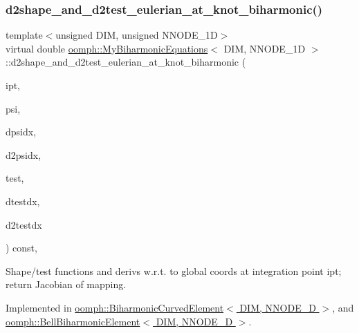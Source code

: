 \subsubsection{\texorpdfstring{d2shape\+\_\+and\+\_\+d2test\+\_\+eulerian\+\_\+at\+\_\+knot\+\_\+biharmonic()}{d2shape\_and\_d2test\_eulerian\_at\_knot\_biharmonic()}\hspace{0.1cm}{\footnotesize\ttfamily [2/2]}}
{\footnotesize\ttfamily template$<$unsigned D\+IM, unsigned N\+N\+O\+D\+E\+\_\+1D$>$ \\
virtual double \hyperlink{classoomph_1_1MyBiharmonicEquations}{oomph\+::\+My\+Biharmonic\+Equations}$<$ D\+IM, N\+N\+O\+D\+E\+\_\+1D $>$\+::d2shape\+\_\+and\+\_\+d2test\+\_\+eulerian\+\_\+at\+\_\+knot\+\_\+biharmonic (\begin{DoxyParamCaption}\item[{const unsigned \&}]{ipt,  }\item[{Shape \&}]{psi,  }\item[{D\+Shape \&}]{dpsidx,  }\item[{D\+Shape \&}]{d2psidx,  }\item[{Shape \&}]{test,  }\item[{D\+Shape \&}]{dtestdx,  }\item[{D\+Shape \&}]{d2testdx }\end{DoxyParamCaption}) const\hspace{0.3cm}{\ttfamily [protected]}, {}}



Shape/test functions and derivs w.\+r.\+t. to global coords at integration point ipt; return Jacobian of mapping. 



Implemented in \hyperlink{classoomph_1_1BiharmonicCurvedElement_a89720b99d24708f02135502625ad7e3c}{oomph\+::\+Biharmonic\+Curved\+Element$<$ D\+I\+M, N\+N\+O\+D\+E\+\_\+D $>$}, and \hyperlink{classoomph_1_1BellBiharmonicElement_aceea1798272378f0402ef0e0f324ff3b}{oomph\+::\+Bell\+Biharmonic\+Element$<$ D\+I\+M, N\+N\+O\+D\+E\+\_\+D $>$}.

\mbox{\label{classoomph_1_1MyBiharmonicEquations_a4597b3938b6f1244d6e8e0f58250c14a}} 
